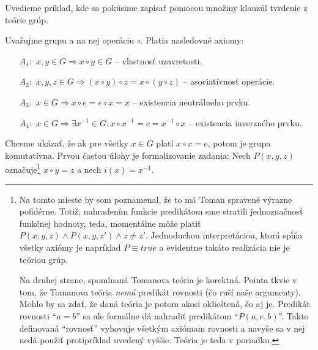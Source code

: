 \begin{priklad}
    Uvedieme príklad, kde sa pokúsime zapísať pomocou množiny
    klauzúl tvrdenie z teórie grúp. 

    \par Uvažujme grupu a na nej operáciu $\circ$.
    Platia nasledovné axiomy:
    \begin{itemize}
        \item [$A_1:$] $x, y \in G \Rightarrow x \circ y \in G$ --
                vlastnosť uzavretosti.
        \item [$A_2:$] $x, y, z \in G \Rightarrow 
                        (x \circ y) \circ z = x \circ (y \circ z)$ --
                asociatívnosť operácie.
        \item [$A_3:$] $x \in G \Rightarrow x \circ e = e \circ x = x$ --
                existencia neutrálneho prvku.
        \item [$A_4:$] $x \in G \Rightarrow \exists x^{-1} \in G :
                            x \circ x^{-1} = e = x^{-1} \circ x$ --
                existencia inverzného prvku.
    \end{itemize}

    Chceme ukázať, že ak pre všetky $x \in G$ platí $x \circ x = e$,
    potom je grupa komutatívna. Prvou časťou úlohy je formalizovanie zadania:
    Nech $P(x,y,z)$ označuje\footnote{ %
        Na tomto mieste by som poznamenal, že to má Toman spravené
        výrazne pofidérne.
        Totiž, nahradením funkcie predikátom sme stratili jednoznačnosť
        funkčnej hodnoty, teda, momentálne môže platiť
        $P(x,y,z) \land P(x,y,z') \land z \ne z'$. Jednoduchou
        interpretáciou, ktorá spĺňa všetky axiómy je napríklad
        $P \equiv true$ a evidentne takáto realizácia nie je teóriou grúp.

        Na druhej strane, spomínaná Tomanova teória je korektná.
        Pointa tkvie v tom, že Tomanova teória {\it nemá}
        predikát rovnosti (čo ruší naše argumenty). Mohlo by sa zdať,
        že daná teória je potom akosi oklieštená, čo aj je.
        Predikát rovnosti ``$a=b$'' sa ale formálne dá nahradiť predikátom
        ``$P(a,e,b)$''. Takto definovaná ``rovnosť'' vyhovuje všetkým
        axiómam rovnosti a navyše sa v nej nedá použiť protipríklad
        uvedený vyššie. Teória je teda v poriadku.
    }
    $x \circ y = z$ a nech  $i(x) = x^{-1}$.


\end{priklad}
